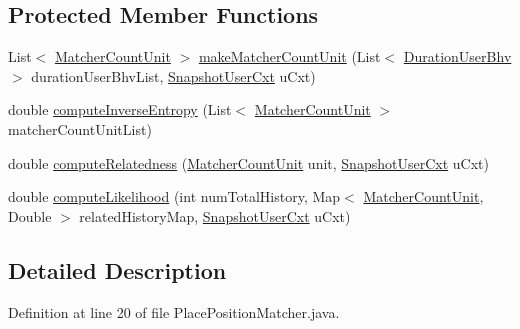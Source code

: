 \subsection*{\-Protected \-Member \-Functions}
\begin{DoxyCompactItemize}
\item 
\-List$<$ \hyperlink{classlab_1_1davidahn_1_1appshuttle_1_1predict_1_1matcher_1_1_matcher_count_unit}{\-Matcher\-Count\-Unit} $>$ \hyperlink{classlab_1_1davidahn_1_1appshuttle_1_1predict_1_1matcher_1_1position_1_1_place_position_matcher_aa119112e5551c1b55067c68de74a0964}{make\-Matcher\-Count\-Unit} (\-List$<$ \hyperlink{classlab_1_1davidahn_1_1appshuttle_1_1collect_1_1bhv_1_1_duration_user_bhv}{\-Duration\-User\-Bhv} $>$ duration\-User\-Bhv\-List, \hyperlink{classlab_1_1davidahn_1_1appshuttle_1_1collect_1_1_snapshot_user_cxt}{\-Snapshot\-User\-Cxt} u\-Cxt)
\item 
double \hyperlink{classlab_1_1davidahn_1_1appshuttle_1_1predict_1_1matcher_1_1position_1_1_place_position_matcher_aad3d883f47ba687b6e1c77527d4e266a}{compute\-Inverse\-Entropy} (\-List$<$ \hyperlink{classlab_1_1davidahn_1_1appshuttle_1_1predict_1_1matcher_1_1_matcher_count_unit}{\-Matcher\-Count\-Unit} $>$ matcher\-Count\-Unit\-List)
\item 
double \hyperlink{classlab_1_1davidahn_1_1appshuttle_1_1predict_1_1matcher_1_1position_1_1_place_position_matcher_a42764115ab4acb83c2fbecaa5fea4c25}{compute\-Relatedness} (\hyperlink{classlab_1_1davidahn_1_1appshuttle_1_1predict_1_1matcher_1_1_matcher_count_unit}{\-Matcher\-Count\-Unit} unit, \hyperlink{classlab_1_1davidahn_1_1appshuttle_1_1collect_1_1_snapshot_user_cxt}{\-Snapshot\-User\-Cxt} u\-Cxt)
\item 
double \hyperlink{classlab_1_1davidahn_1_1appshuttle_1_1predict_1_1matcher_1_1position_1_1_place_position_matcher_a4685328a0c27a406e8ab92524bd5400c}{compute\-Likelihood} (int num\-Total\-History, \-Map$<$ \hyperlink{classlab_1_1davidahn_1_1appshuttle_1_1predict_1_1matcher_1_1_matcher_count_unit}{\-Matcher\-Count\-Unit}, \-Double $>$ related\-History\-Map, \hyperlink{classlab_1_1davidahn_1_1appshuttle_1_1collect_1_1_snapshot_user_cxt}{\-Snapshot\-User\-Cxt} u\-Cxt)
\end{DoxyCompactItemize}


\subsection{\-Detailed \-Description}


\-Definition at line 20 of file \-Place\-Position\-Matcher.\-java.



